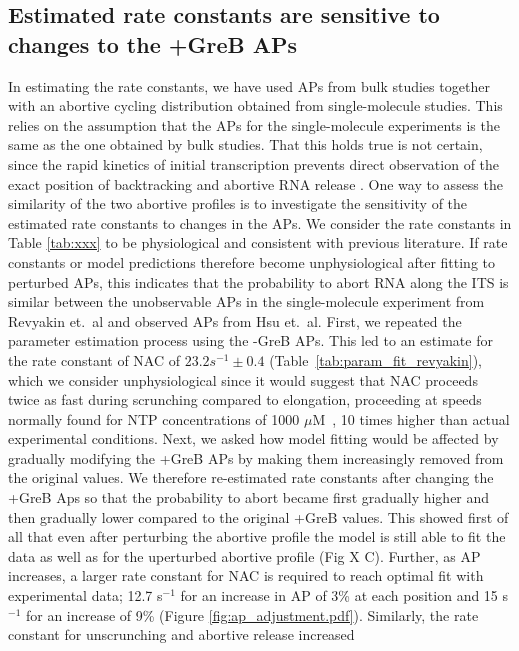 \subsection{Estimated rate constants are sensitive to changes to the +GreB 
APs}
In estimating the rate constants, we have used APs from
bulk studies together with an abortive cycling distribution obtained from
single-molecule studies. This relies on the assumption that the APs for the
single-molecule experiments is the same as the one obtained by bulk studies.
That this holds true is not certain, since the rapid kinetics of initial
transcription prevents direct observation of the exact position of
backtracking and abortive RNA release \cite{margeat_direct_2006,
revyakin_abortive_2006}. One way to assess the similarity of the two abortive
profiles is to investigate the sensitivity of the estimated rate constants to
changes in the APs. We consider the rate constants in Table
\ref{tab:xxx} to be physiological and consistent with previous literature. If
rate constants or model predictions therefore become unphysiological after
fitting to perturbed APs, this indicates that the probability to abort RNA
along the ITS is similar between the unobservable APs in the single-molecule
experiment from Revyakin et.\ al and observed APs from Hsu et.\ al. First, we
repeated the parameter estimation process using the -GreB APs. This led to an
estimate for the rate constant of NAC of $23.2 s^{-1} \pm 0.4$
(Table~\ref{tab:param_fit_revyakin}), which we consider unphysiological since
it would suggest that NAC proceeds twice as fast during scrunching compared to
elongation, proceeding at speeds normally found for NTP concentrations of 1000
$\mu$M~\cite{bai_mechanochemical_2007}, 10 times higher than actual
experimental conditions. Next, we asked how model fitting would be affected by
gradually modifying the +GreB APs by making them increasingly removed from the
original values. We therefore re-estimated rate constants after changing the
+GreB Aps so that the probability to abort became first gradually higher and
then gradually lower compared to the original +GreB values. This showed first
of all that even after perturbing the abortive profile the model is still able
to fit the data as well as for the uperturbed abortive profile (Fig X C).
Further, as AP increases, a larger rate constant for NAC is required to reach optimal
fit with experimental data; 12.7 s$^{-1}$ for an increase in AP of 3\% at each position
and 15 s$^{-1}$ for an increase of 9\% (Figure \ref{fig:ap_adjustment.pdf}).
Similarly, the rate constant for unscrunching and abortive release increased
